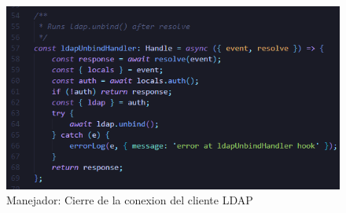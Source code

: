\begin{figure}[h]
    \centering
    \includegraphics[width=\textwidth]{images/code/ldapUnbindHandler.png}
    \caption{Manejador: Cierre de la conexion del cliente LDAP}
    \label{fig:ldap-unbind-handler}
\end{figure}

